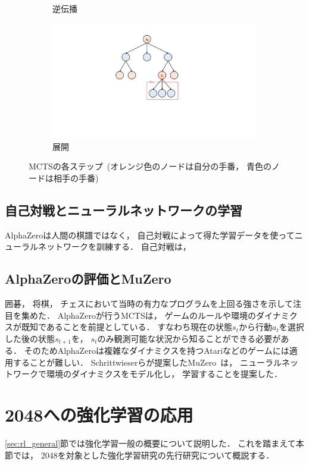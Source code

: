 \begin{figure}
\begin{subfigure}[T]{0.4\columnwidth}
    \caption{逆伝播}
    \label{fig:backpropagate}
  \end{subfigure}
  \hspace{3cm}
  \begin{subfigure}[T]{0.4\columnwidth}
    \centering
    \includegraphics[width=\columnwidth]{figures/expand_.pdf}
    \caption{展開}
    \label{fig:expand}
  \end{subfigure}
  \caption{MCTSの各ステップ~(オレンジ色のノードは自分の手番， 青色のノードは相手の手番)}
  \label{fig:mcts}
\end{figure}

\subsection{自己対戦とニューラルネットワークの学習}
AlphaZeroは人間の棋譜ではなく， 自己対戦によって得た学習データを使ってニューラルネットワークを訓練する．
自己対戦は， 


\subsection{AlphaZeroの評価とMuZero}
囲碁， 将棋， チェスにおいて当時の有力なプログラムを上回る強さを示して注目を集めた．
AlphaZeroが行うMCTSは， ゲームのルールや環境のダイナミクスが既知であることを前提としている．
すなわち現在の状態$s_t$から行動$a_t$を選択した後の状態$s_{t+1}$を， $s_t$のみ観測可能な状況から知ることができる必要がある．
そのためAlphaZeroは複雑なダイナミクスを持つAtariなどのゲームには適用することが難しい．
Schrittwieserらが提案したMuZero~\cite{MuZero}は， ニューラルネットワークで環境のダイナミクスをモデル化し， 学習することを提案した．

\section{2048への強化学習の応用}
\ref{sec:rl_general}節では強化学習一般の概要について説明した．
これを踏まえて本節では， 2048を対象とした強化学習研究の先行研究について概説する．


